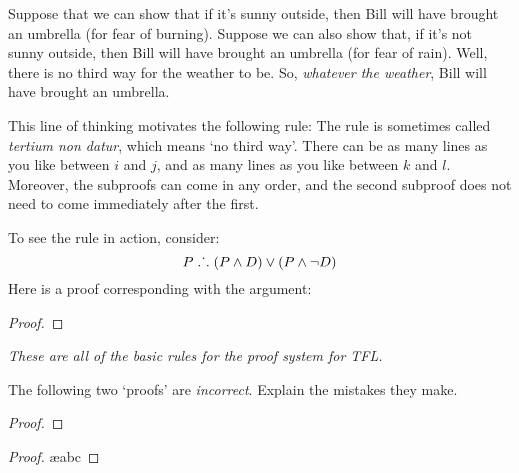 Suppose that we can show that if it's sunny outside, then Bill will have brought an umbrella (for fear of burning). Suppose we can also show that, if it's not sunny outside, then Bill will have brought an umbrella (for fear of rain). Well, there is no third way for the weather to be. So, \emph{whatever the weather}, Bill will have brought an umbrella. 

This line of thinking motivates the following rule:
The rule is sometimes called \emph{tertium non datur}, which means `no third way'. There can be as many lines as you like between $i$ and $j$, and as many lines as you like between $k$ and $l$. Moreover, the subproofs can come in any order, and the second subproof does not need to come immediately after the first.

To see the rule in action, consider:
	$$P \mathrel{\ldotp\dot{}\,\ldotp} (P \wedge D) \vee (P \wedge \neg D)$$
Here is a proof corresponding with the argument:
	\begin{proof}
		\open
		\close
		\open
		\close
	\end{proof}
\emph{These are all of the basic rules for the proof system for TFL.}

\practiceproblems

\problempart
The following two `proofs' are \emph{incorrect}. Explain the mistakes they make.
\begin{proof}
\open
\close
\open
\close
{}
\end{proof}

\begin{proof}
\ae{abc}
\end{proof}

